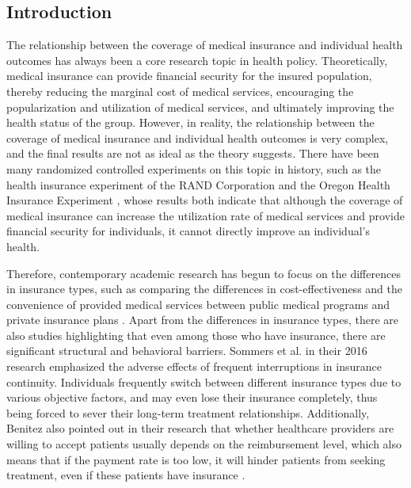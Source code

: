 \subsection{Introduction}

The relationship between the coverage of medical insurance and individual health outcomes has always been a core research topic in health policy. Theoretically, medical insurance can provide financial security for the insured population, thereby reducing the marginal cost of medical services, encouraging the popularization and utilization of medical services, and ultimately improving the health status of the group. However, in reality, the relationship between the coverage of medical insurance and individual health outcomes is very complex, and the final results are not as ideal as the theory suggests. There have been many randomized controlled experiments on this topic in history, such as the health insurance experiment of the RAND Corporation \cite{Manning1987Health} and the Oregon Health Insurance Experiment \cite{doi:10.1056/NEJMsa1212321}, whose results both indicate that although the coverage of medical insurance can increase the utilization rate of medical services and provide financial security for individuals, it cannot directly improve an individual's health.

Therefore, contemporary academic research has begun to focus on the differences in insurance types, such as comparing the differences in cost-effectiveness and the convenience of provided medical services between public medical programs and private insurance plans \cite{Allen_Gordon_Lee_Bhanja_Sommers_2021}. Apart from the differences in insurance types, there are also studies highlighting that even among those who have insurance, there are significant structural and behavioral barriers. Sommers et al. in their 2016 research emphasized the adverse effects of frequent interruptions in insurance continuity. Individuals frequently switch between different insurance types due to various objective factors, and may even lose their insurance completely, thus being forced to sever their long-term treatment relationships. Additionally, Benitez also pointed out in their research that whether healthcare providers are willing to accept patients usually depends on the reimbursement level, which also means that if the payment rate is too low, it will hinder patients from seeking treatment, even if these patients have insurance \cite{Benitez_Freed_Huang_Oladele_2024}.

